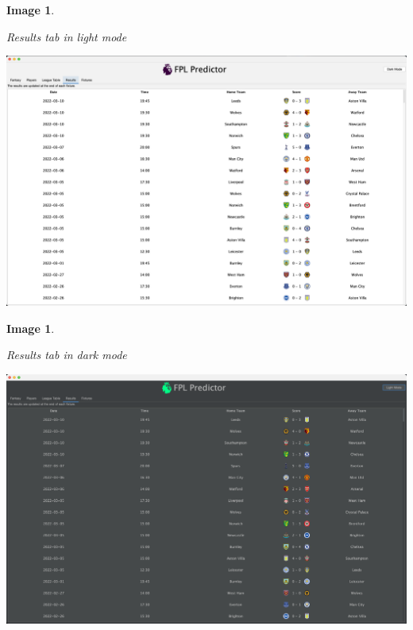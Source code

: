 \documentclass[12pt, a4paper, oneside]{book}
\newtheorem{image}[theorem]{Image}
\numberwithin{equation}{section}
\begin{document}
\begin{image} \label{Results tab in light mode}

  Results tab in light mode

  \vspace{0.5cm}

  \centerline{\includegraphics[width=1\textwidth]{images/gui/results-tab/light.png}}

\end{image}

\begin{image} \label{Results tab in dark mode}

  Results tab in dark mode

  \vspace{0.5cm}

  \centerline{\includegraphics[width=1\textwidth]{images/gui/results-tab/dark.png}}

\end{image}
\end{document}
